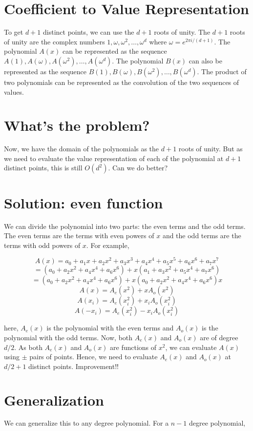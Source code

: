 \documentclass[28]{report}
\begin{document}
\section{Coefficient to Value Representation}
To get \(d+1\) distinct points, we can use the \(d+1\) roots of unity. The \(d+1\) roots of unity are the complex numbers \(1, \omega, \omega^2, \ldots, \omega^d\) where \(\omega = e^{2\pi i/(d+1)}\). The polynomial \(A(x)\) can be represented as the sequence \(A(1), A(\omega), A(\omega^2), \ldots, A(\omega^d)\). The polynomial \(B(x)\) can also be represented as the sequence \(B(1), B(\omega), B(\omega^2), \ldots, B(\omega^d)\). The product of two polynomials can be represented as the convolution of the two sequences of values.


\section{What's the problem?}
Now, we have the domain of the polynomials as the \(d+1\) roots of unity. But as we need to evaluate the value representation of each of the polynomial at \(d+1\) distinct points, this is still \(O(d^2)\). Can we do better? 

\section{Solution: even function}
We can divide the polynomial into two parts: the even terms and the odd terms. The even terms are the terms with even powers of \(x\) and the odd terms are the terms with odd powers of \(x\). For example, 



    
	$$A(x) = a_0 + a_1x + a_2x^2 + a_3x^3 + a_4x^4 + a_5x^5 + a_6x^6 + a_7x^7$$
	$$ = (a_0 + a_2x^2 + a_4x^4 + a_6x^6) + x(a_1 + a_3x^2 + a_5x^4 + a_7x^6)$$
	$$ =  (a_0 + a_2x^2 + a_4x^4 + a_6x^6) + x(a_0 + a_2x^2 + a_4x^4 + a_6x^6)x $$
	$$A(x)= A_e(x^2) + xA_o(x^2)$$
	$$A(x_i) = A_e(x_i^2) + x_iA_o(x_i^2)$$
	$$A(-x_i) = A_e(x_i^2) - x_iA_o(x_i^2)$$

here, \(A_e(x)\) is the polynomial with the even terms and \(A_o(x)\) is the polynomial with the odd terms. Now, both \(A_e(x)\) and \(A_o(x)\) are of degree \(d/2\). 
As both \(A_e(x)\) and \(A_o(x)\) are functions of \(x^2\), we can evaluate \(A(x)\) using \(\pm\) pairs of points. Hence, we need to evaluate \(A_e(x)\) and \(A_o(x)\) at \(d/2 + 1\) distinct points. Improvement!!

\section{Generalization}
We can generalize this to any degree polynomial.
For a \(n-1\) degree polynomial, 
\end{document}
